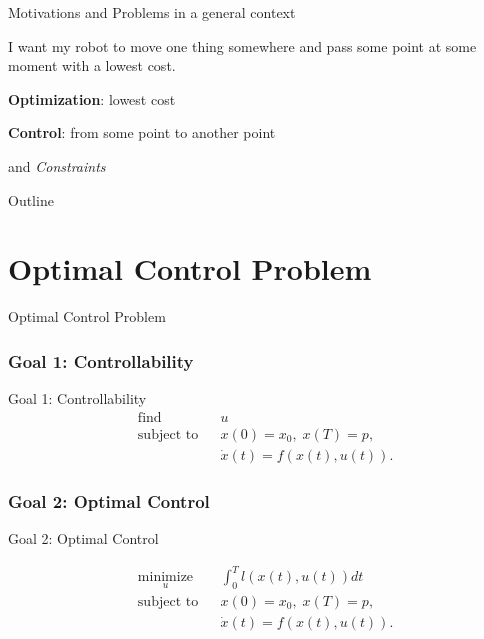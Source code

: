 \documentclass{beamer}
\begin{document}
\begin{frame}{Motivations and Problems in a general context}

I want my robot to move one thing somewhere and pass some point at some moment with a lowest cost.

\bigskip

\textbf{Optimization}: lowest cost

\textbf{Control}: from some point to another point

and \emph{Constraints}
\end{frame}


\begin{frame}{Outline}
\tableofcontents
\end{frame}

\section{Optimal Control Problem}

  \begin{frame}{Optimal Control	Problem}
    \subsubsection{Goal 1: Controllability}

Goal 1: Controllability
	\begin{equation}
	\begin{aligned}
	& {\text{find}}
	& & u \\
	& \text{subject to}
	& & x(0) = x_0, \; x(T) = p, \\
	&&& \dot{x} (t) = f(x(t), u(t)).
	\end{aligned}
	\end{equation}
	
	\subsubsection{Goal 2: Optimal Control}

Goal 2: Optimal Control	 
	
	\begin{equation}
	\begin{aligned}
	& \underset{u}{\text{minimize}}
	& & \int_0^T l(x(t),u(t)) dt \\
	& \text{subject to}
	& & x(0) = x_0, \; x(T) = p, \\
	&&& \dot{x} (t) = f(x(t), u(t)).
	\end{aligned}
	\end{equation}
	
  \end{frame}
  
\end{document}
